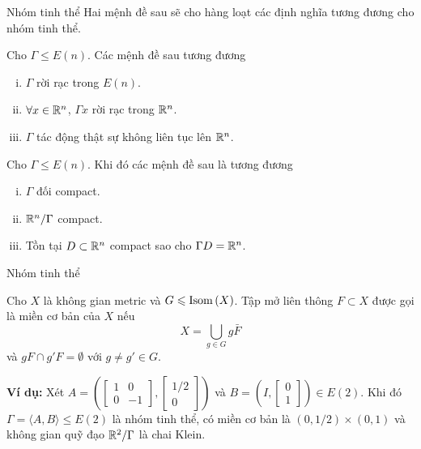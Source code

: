 \begin{frame}{Nhóm tinh thể}
    Hai mệnh đề sau sẽ cho hàng loạt các định nghĩa tương đương cho nhóm tinh thể.
    \begin{proposition}\label{prop:discrete}
        Cho $\Gamma \leq E(n)$. Các mệnh đề sau tương đương
        \begin{enumerate}[(i)]
            \item $\Gamma$ rời rạc trong $E(n)$.
            \item $\forall x \in \mathbb R^n$, $\Gamma x$ rời rạc trong $\mathbb R^n$.
            \item $\Gamma$ tác động thật sự không liên tục lên $\mathbb R^n$.
        \end{enumerate}
    \end{proposition}

    \begin{proposition}\label{prop:cocompact}
        Cho $\Gamma \leq E(n)$. Khi đó các mệnh đề sau là tương đương
        \begin{enumerate}[(i)]
            \item $\Gamma$ đối compact.
            \item $\mathbb R^n/\Gamma$ compact.
            \item Tồn tại $D \subset \mathbb R^n$ compact sao cho $\Gamma D = \mathbb R^n$.
        \end{enumerate}
    \end{proposition}
\end{frame}

\begin{frame}{Nhóm tinh thể}
    \begin{define}
        Cho $X$ là không gian metric và $G \leqslant \operatorname{Isom}{(X)}$. Tập mở liên thông $F \subset X$ được gọi là \alert{miền cơ bản} của $X$ nếu 
        $$
            X = \bigcup_{g \in G} g \bar{F}
        $$
        và $gF \cap g'F = \emptyset$ với $g \neq g' \in G$.
    \end{define}

    \textbf{Ví dụ:} Xét $A = \left(\begin{bmatrix}1 & 0 \\ 0 & -1\end{bmatrix}, \begin{bmatrix}1/2 \\ 0\end{bmatrix}\right)$ và $B = \left(I, \begin{bmatrix}0 \\ 1\end{bmatrix}\right) \in E(2)$. Khi đó $\Gamma = \langle A,B \rangle \leq E(2)$ là nhóm tinh thể, có miền cơ bản là $(0,1/2)\times(0,1)$ và không gian quỹ đạo $\mathbb R^2 / \Gamma$ là chai Klein.
\end{frame}

